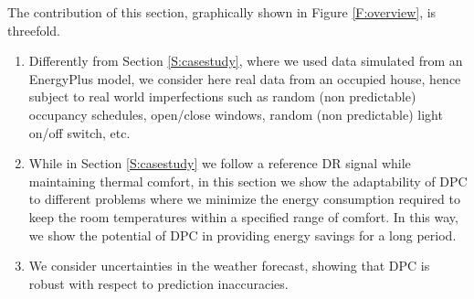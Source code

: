 \textcolor[rgb]{0,0,1}{The contribution of this section, graphically shown in Figure \ref{F:overview}, is threefold.
\begin{enumerate}
	\item Differently from Section \ref{S:casestudy}, where we used data simulated from an EnergyPlus model, we consider here real data from an occupied house, hence subject to real world imperfections such as random (non predictable) occupancy schedules, open/close windows, random (non predictable) light on/off switch, etc.
	\item While in Section \ref{S:casestudy} we follow a reference DR signal while maintaining thermal comfort, in this section we show the adaptability of DPC to different problems where we minimize the energy consumption required to keep the room temperatures within a specified range of comfort. In this way, we show the potential of DPC in providing energy savings for a long period.
	\item We consider uncertainties in the weather forecast, showing that DPC is robust with respect to prediction inaccuracies.
\end{enumerate}}
